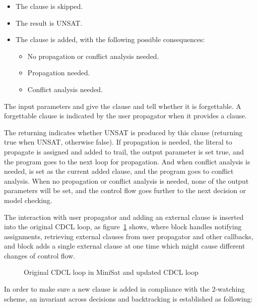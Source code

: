\begin{itemize}
  \item The clause is skipped.
  \item The result is UNSAT.
  \item The clause is added, with the following possible consequences:
    \begin{itemize}
      \item No propagation or conflict analysis needed.
      \item Propagation needed.
      \item Conflict analysis needed.
    \end{itemize}
\end{itemize}

The input parameters  and  give the clause and tell whether it is forgettable. A forgettable clause is indicated by the user propagator when it provides a clause.

The returning  indicates whether UNSAT is produced by this clause (returning true when UNSAT, otherwise false). If propagation is needed, the literal to propagate is assigned and added to trail, the output parameter  is set true, and the program goes to the next loop for propagation. And when conflict analysis is needed,  is set as the current added clause, and the program goes to conflict analysis. When no propagation or conflict analysis is needed, none of the output parameters will be set, and the control flow goes further to the next decision or model checking.

The interaction with user propagator and adding an external clause is inserted into the original CDCL loop, as figure~\ref{fig:flow} shows, where  block handles notifying assignments, retrieving external clauses from user propagator and other callbacks, and  block adds a single external clause at one time which might cause different changes of control flow.

\begin{figure}[!htbp]
  \centering
  
  \caption{Original CDCL loop in MiniSat and updated CDCL loop}
  \label{fig:flow}
\end{figure}

In order to make sure a new clause is added in compliance with the 2-watching scheme, an invariant across decisions and backtracking is established as following:

